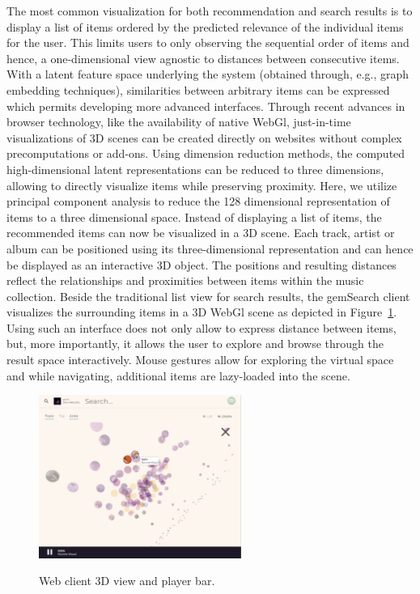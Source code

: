 \documentclass[sigconf]{acmart}
\begin{document}
The most common visualization for both recommendation and search results is to display a list of items ordered by the predicted relevance of the individual items for the user. This limits users to only observing the sequential order of items and hence, a one-dimensional view agnostic to distances between consecutive items. With a latent feature space underlying the system (obtained through, e.g., graph embedding techniques), similarities between arbitrary items can be expressed which permits developing more advanced interfaces. Through recent advances in browser technology, like the availability of native WebGl, just-in-time visualizations of 3D scenes can be created directly on websites without complex precomputations or add-ons. 
Using dimension reduction methods, the computed high-dimensional latent representations can be reduced to three dimensions, allowing to directly visualize items while preserving proximity. Here, we utilize principal component analysis to reduce the 128 dimensional representation of items to a three dimensional space. Instead of displaying a list of items, the recommended items can now be visualized in a 3D scene. Each track, artist or album can be positioned using its three-dimensional representation and can hence be displayed as an interactive 3D object. The positions and resulting distances reflect the relationships and proximities between items within the music collection. Beside the traditional list view for search results, the gemSearch client visualizes the surrounding items in a 3D WebGl scene as depicted in Figure~\ref{fig:web_client_3d}. Using such an interface does not only allow to express distance between items, but, more importantly, it allows the user to explore and browse through the result space interactively. Mouse gestures allow for exploring the virtual space and while navigating, additional items are lazy-loaded into the scene. 


\begin{figure}[ht]
	{\includegraphics[width=250px]{images/webclient_3d.jpg}}	
	\caption{Web client 3D view and player bar.}
	\label{fig:web_client_3d}
\end{figure}
\end{document}
